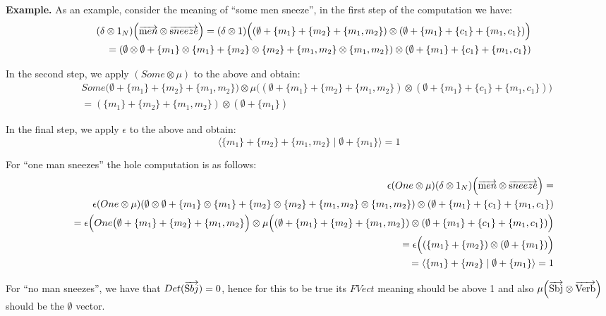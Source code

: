 \bigskip
\noindent
{\bf Example.}
As an example,  consider  the  meaning  of  ``some men sneeze'', in the first step of the computation we have:
\begin{eqnarray*}
&&(\delta \otimes 1_N) \Big(\overrightarrow{\text men} \otimes \overrightarrow{\text sneeze}\Big) = (\delta \otimes 1) \Big((\emptyset + \{m_1\} + \{m_2\} + \{m_1, m_2\}) \otimes (\emptyset + \{m_1\} + \{c_1\} + \{m_1, c_1\}) \Big)\\
&&=  (\emptyset \otimes \emptyset + \{m_1\} \otimes \{m_1\} + \{m_2\} \otimes \{m_2\} + \{m_1, m_2\} \otimes \{m_1, m_2\}) \otimes (\emptyset + \{m_1\} + \{c_1\} + \{m_1, c_1\})
\end{eqnarray*}

\noindent
In the second step, we apply $(Some \otimes \mu)$ to the above and obtain:
\begin{eqnarray*}
&& Some\Big(\emptyset + \{m_1\} + \{m_2\} + \{m_1, m_2\}\Big) \otimes \mu \Big((\emptyset  + \{m_1\}  + \{m_2\}  + \{m_1, m_2\}) \otimes (\emptyset + \{m_1\} + \{c_1\} + \{m_1, c_1\})\Big) \\
&&= (\{m_1\} + \{m_2\} + \{m_1, m_2\}) \otimes (\emptyset + \{m_1\})
\end{eqnarray*}

\noindent
In the final step, we apply $\epsilon$ to the above and obtain:
\[
\langle \{m_1\} + \{m_2\} + \{m_1, m_2\} \mid \emptyset + \{m_1\} \rangle =  1
\]

\noindent
For ``one man sneezes'' the hole computation is as follows:
\begin{eqnarray*}
&&\epsilon(One \otimes \mu)(\delta \otimes 1_N) \Big(\overrightarrow{\text men} \otimes \overrightarrow{\text sneeze}\Big) = \\
&&  \epsilon(One \otimes \mu)(\emptyset \otimes \emptyset + \{m_1\} \otimes \{m_1\} + \{m_2\} \otimes \{m_2\} + \{m_1, m_2\} \otimes \{m_1, m_2\}) \otimes (\emptyset + \{m_1\} + \{c_1\} + \{m_1, c_1\})\\
&&= \epsilon \Big (One\big(\emptyset + \{m_1\} + \{m_2\} + \{m_1, m_2\}\Big) \otimes \mu \Big((\emptyset  + \{m_1\}  + \{m_2\}  + \{m_1, m_2\}) \otimes (\emptyset + \{m_1\} + \{c_1\} + \{m_1, c_1\})\Big) \\
&&= \epsilon \Big((\{m_1\} + \{m_2\} ) \otimes (\emptyset + \{m_1\})\Big)\\
&&= \langle \{m_1\} + \{m_2\}  \mid \emptyset + \{m_1\} \rangle =  1
\end{eqnarray*}


\noindent
For ``no man sneezes'', we have that $Det(\overrightarrow{\text Sbj}) = 0$, hence for this to be true its $FVect$ meaning should be above 1 and also $\mu \Big(\overrightarrow{\text{Sbj}} \otimes \overrightarrow{\text{Verb}} \Big)$ should be the $\emptyset$ vector. 

